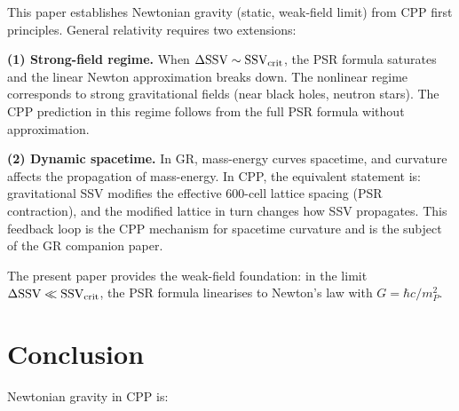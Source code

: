 \documentclass[12pt]{article}
\newcommand{\mP}{m_P}
\newcommand{\SSV}{\text{SSV}}
\begin{document}
\label{sec:GR}

This paper establishes Newtonian gravity (static, weak-field limit) from
CPP first principles.  General relativity requires two extensions:

\textbf{(1) Strong-field regime.}  When $\Delta\SSV \sim \SSV_{\rm crit}$,
the PSR formula saturates and the linear Newton approximation breaks down.
The nonlinear regime corresponds to strong gravitational fields (near black
holes, neutron stars).  The CPP prediction in this regime follows from the
full PSR formula without approximation.

\textbf{(2) Dynamic spacetime.}  In GR, mass-energy curves spacetime, and
curvature affects the propagation of mass-energy.  In CPP, the equivalent
statement is: gravitational SSV modifies the effective 600-cell lattice
spacing (PSR contraction), and the modified lattice in turn changes how SSV
propagates.  This feedback loop is the CPP mechanism for spacetime curvature
and is the subject of the GR companion paper.

The present paper provides the weak-field foundation: in the limit
$\Delta\SSV \ll \SSV_{\rm crit}$, the PSR formula linearises to Newton's
law with $G = \hbar c/\mP^2$.

\section{Conclusion}
\label{sec:conclusion}

Newtonian gravity in CPP is:
\end{document}
